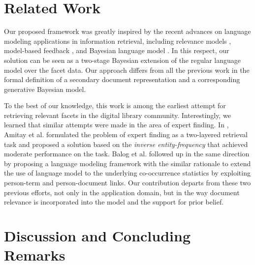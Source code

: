 
\section{Related Work}\label{s:related-work}

Our proposed framework was greatly inspired by the recent advances on language
modeling applications in information retrieval, including relevance models
\cite{lavrenko2001relevance,lavrenko2002cross-lingual}, model-based feedback
\cite{zhai2001language}, and Bayesian language model
\cite{zaragorza2003bayesian}.  In this respect, our solution can be seen as a
two-stage Bayesian extension of the regular language model over the facet data.
Our approach differs from all the previous work in the formal definition of a
secondary document representation and a corresponding generative Bayesian
model.  

To the best of our knowledge, this work is among the earliest attempt for
retrieving relevant facets in the digital library community.  Interestingly, we
learned that similar attempts were made in the area of expert finding.  In
\cite{amitay2008finding}, Amitay et al. formulated the problem of expert
finding as a two-layered retrieval task and proposed a solution based on the
\emph{inverse entity-frequency} that achieved moderate performance on the task.
Balog et al. \cite{balog2009language} followed up in the same direction by
proposing a language modeling framework with the similar rationale to extend
the use of language model to the underlying co-occurrence statistics by
exploiting person-term and person-document links.  Our contribution departs
from these two previous efforts, not only in the application domain, but in the
way document relevance is incorporated into the model and the support for prior
belief.  
 
\section{Discussion and Concluding Remarks}\label{s:concluding-remarks}

